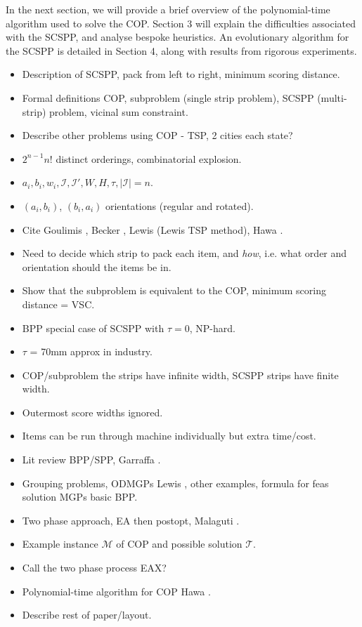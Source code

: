 \documentclass{elsarticle}
\begin{document}
In the next section, we will provide a brief overview of the polynomial-time algorithm used to solve the COP. Section 3 will explain the difficulties associated with the SCSPP, and analyse bespoke heuristics. An evolutionary algorithm for the SCSPP is detailed in Section 4, along with results from rigorous experiments.  

\begin{itemize}
	\item Description of SCSPP, pack from left to right, minimum scoring distance.
	\item Formal definitions COP, subproblem (single strip problem), SCSPP (multi-strip) problem, vicinal sum constraint.
	\item Describe other problems using COP - TSP, 2 cities each state?
	\item $2^{n-1} n!$ distinct orderings, combinatorial explosion.
	\item $a_i, b_i, w_i, \mathcal{I}, \mathcal{I}', W, H, \tau, |\mathcal{I}| = n$.
	\item $(a_i, b_i)$, $(b_i, a_i)$ orientations (regular and rotated).
	\item Cite Goulimis \cite{goulimis2004}, Becker \cite{becker2015}, Lewis \cite{lewis2011} (Lewis TSP method), Hawa \cite{hawa2018}.
	\item Need to decide which strip to pack each item, and \emph{how}, i.e. what order and orientation should the items be in.
	\item Show that the subproblem is equivalent to the COP, minimum scoring distance = VSC.
	\item BPP special case of SCSPP with $\tau = 0$, NP-hard.
	\item $\tau$ = 70mm approx in industry. 
	\item COP/subproblem the strips have infinite width, SCSPP strips have finite width.
	\item Outermost score widths ignored.
	\item Items can be run through machine individually but extra time/cost.
	\item Lit review BPP/SPP, Garraffa \cite{garraffa2016}.
	\item Grouping problems, ODMGPs Lewis \cite{lewis2009}, other examples, formula for feas solution MGPs basic BPP.
	\item Two phase approach, EA then postopt, Malaguti \cite{malaguti2008}.
	\item Example instance $\mathcal{M}$ of COP and possible solution $\mathcal{T}$.
	\item Call the two phase process EAX?
	\item Polynomial-time algorithm for COP Hawa \cite{hawa2018}.
	\item Describe rest of paper/layout.
\end{itemize}
\end{document}
